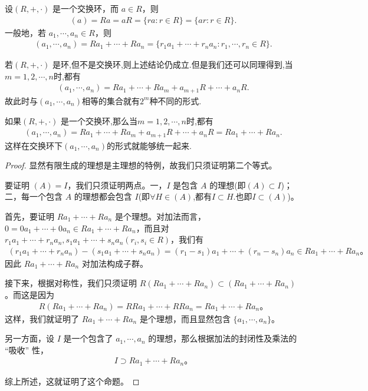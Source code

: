 \documentclass[../../main.tex]{subfiles}
\begin{document}
\begin{proposition}\label{proposition:生成的理想的集合表示}
设$(R, +, \cdot)$ 是一个交换环，而 $a \in R$，则
\begin{align*}
(a) = Ra = aR= \{ra : r \in R\}= \{ar : r \in R\}.
\end{align*}
一般地，若 $a_1, \cdots, a_n \in R$，则
\begin{align*}
(a_1, \cdots, a_n) = Ra_1 + \cdots + Ra_n = \{r_1a_1 + \cdots + r_na_n : r_1, \cdots, r_n \in R\} .
\end{align*}
\end{proposition}
\begin{remark}
若$(R, +, \cdot)$ 是环,但不是交换环,则上述结论仍成立.但是我们还可以同理得到,当$m=1,2,\cdots,n$时,都有
\begin{align*}
\left( a_1,\cdots ,a_n \right) =Ra_1+\cdots +Ra_m+a_{m+1}R+\cdots +a_nR.
\end{align*}
故此时与$(a_1,\cdots,a_n)$相等的集合就有$2^m$种不同的形式.

如果$(R, +, \cdot)$ 是一个交换环,那么当$m=1,2,\cdots,n$时,都有
\begin{align*}
\left( a_1,\cdots ,a_n \right) =Ra_1+\cdots +Ra_m+a_{m+1}R+\cdots +a_nR=Ra_1 + \cdots + Ra_n.
\end{align*}
这样在交换环下$(a_1,\cdots,a_n)$的形式就能够统一起来.
\end{remark}
\begin{proof}
显然有限生成的理想是主理想的特例，故我们只须证明第二个等式。

要证明 $(A) = I$，我们只须证明两点。一，$I$ 是包含 $A$ 的理想(即$(A)\subset I$)；二，每一个包含 $A$ 的理想都会包含 $I$(即$\forall H\in (A)$,都有$I\subset H$.也即$I\subset (A)$)。

首先，要证明 $Ra_1 + \cdots + Ra_n$ 是个理想。对加法而言，$0 = 0a_1 + \cdots + 0a_n \in Ra_1 + \cdots + Ra_n$，而且对 $r_1a_1 + \cdots + r_na_n, s_1a_1 + \cdots + s_na_n (r_i, s_i \in R)$，我们有
\begin{align*}
(r_1a_1 + \cdots + r_na_n) - (s_1a_1 + \cdots + s_na_n) = (r_1 - s_1)a_1 + \cdots + (r_n - s_n)a_n \in Ra_1 + \cdots + Ra_n 。
\end{align*}
因此 $Ra_1 + \cdots + Ra_n$ 对加法构成子群。

接下来，根据对称性，我们只须证明 $R(Ra_1 + \cdots + Ra_n) \subset (Ra_1 + \cdots + Ra_n)$。而这是因为
\begin{align*}
R(Ra_1 + \cdots + Ra_n) = RRa_1 + \cdots + RRa_n = Ra_1 + \cdots + Ra_n 。
\end{align*}
这样，我们就证明了 $Ra_1 + \cdots + Ra_n$ 是个理想，而且显然包含 $\{a_1, \cdots, a_n\}$。

另一方面，设 $I$ 是一个包含了 $a_1, \cdots, a_n$ 的理想，那么根据加法的封闭性及乘法的 “吸收” 性，
\begin{align*}
I \supset Ra_1 + \cdots + Ra_n 。
\end{align*}

综上所述，这就证明了这个命题。 
\end{proof}
\end{document}
